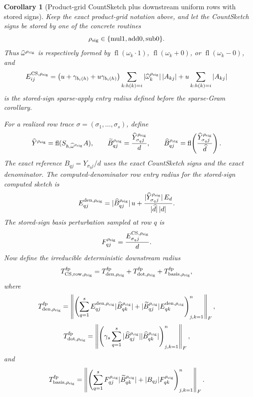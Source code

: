 \documentclass[11pt]{article}
\newcommand{\Frob}[1]{\left\lVert #1\right\rVert_F}
\newcommand{\fl}{\operatorname{fl}}
\newtheorem{corollary}[theorem]{Corollary}
\theoremstyle{remark}
\begin{document}
\begin{corollary}[Product-grid CountSketch plus downstream uniform rows with stored signs]
Keep the exact product-grid notation above, and let the CountSketch signs be
stored by one of the concrete routines
\[
  \rho_{\rm sig}\in\{\mathrm{mul1},\mathrm{add0},\mathrm{sub0}\}.
\]
Thus \(\widehat\omega^{\rho_{\rm sig}}\) is respectively formed by
\(\fl(\omega_k\cdot1)\), \(\fl(\omega_k+0)\), or \(\fl(\omega_k-0)\), and
\[
  E^{{\rm CS},\rho_{\rm sig}}_{ij}
  =
  \bigl(u+\gamma_{b_i(h)}+u\gamma_{b_i(h)}\bigr)
  \sum_{k:h(k)=i}|\widehat\omega_k^{\rho_{\rm sig}}|\,|A_{kj}|
  +
  u\sum_{k:h(k)=i}|A_{kj}|
\]
is the stored-sign sparse-apply entry radius defined before the sparse-Gram
corollary.

For a realized row trace \(\sigma=(\sigma_1,\ldots,\sigma_s)\), define
\[
  \widehat Y^{\rho_{\rm sig}}= \fl(S_{h,\widehat\omega^{\rho_{\rm sig}}}A),
  \qquad
  \widetilde B^{\rho_{\rm sig}}_{qj}
  =
  \frac{\widehat Y^{\rho_{\rm sig}}_{\sigma_qj}}{d},
  \qquad
  \widehat B^{\rho_{\rm sig}}_{qj}
  =
  \fl\!\left(
    \frac{\widehat Y^{\rho_{\rm sig}}_{\sigma_qj}}{\widehat d}
  \right).
\]
The exact reference \(B_{qj}=Y_{\sigma_qj}/d\) uses the exact CountSketch
signs and the exact denominator.  The computed-denominator row entry radius
for the stored-sign computed sketch is
\[
  E^{{\rm den},\rho_{\rm sig}}_{qj}
  =
  |\widehat B^{\rho_{\rm sig}}_{qj}|\,u
  +
  \frac{|\widehat Y^{\rho_{\rm sig}}_{\sigma_qj}|\,E_d}
       {|\widehat d|\,|d|}.
\]
The stored-sign basis perturbation sampled at row \(q\) is
\[
  F^{\rho_{\rm sig}}_{qj}
  =
  \frac{E^{{\rm CS},\rho_{\rm sig}}_{\sigma_qj}}{d}.
\]
Now define the irreducible deterministic downstream radius
\[
  T_{{\rm CS,row},\rho_{\rm sig}}^{\rm fp}
  =
  T_{{\rm den},\rho_{\rm sig}}^{\rm fp}
  +
  T_{{\rm dot},\rho_{\rm sig}}^{\rm fp}
  +
  T_{{\rm basis},\rho_{\rm sig}}^{\rm fp},
\]
where
\[
  T_{{\rm den},\rho_{\rm sig}}^{\rm fp}
  =
  \Frob{
    \left(
      \sum_{q=1}^{s}
      E^{{\rm den},\rho_{\rm sig}}_{qj}
        |\widehat B^{\rho_{\rm sig}}_{qk}|
      +
      |\widetilde B^{\rho_{\rm sig}}_{qj}|
        E^{{\rm den},\rho_{\rm sig}}_{qk}
    \right)_{j,k=1}^{n}
  },
\]
\[
  T_{{\rm dot},\rho_{\rm sig}}^{\rm fp}
  =
  \Frob{
    \left(
      \gamma_s\sum_{q=1}^{s}
      |\widehat B^{\rho_{\rm sig}}_{qj}|
      |\widehat B^{\rho_{\rm sig}}_{qk}|
    \right)_{j,k=1}^{n}
  },
\]
and
\[
  T_{{\rm basis},\rho_{\rm sig}}^{\rm fp}
  =
  \Frob{
    \left(
      \sum_{q=1}^{s}
      F^{\rho_{\rm sig}}_{qj}
        |\widetilde B^{\rho_{\rm sig}}_{qk}|
      +
      |B_{qj}|F^{\rho_{\rm sig}}_{qk}
    \right)_{j,k=1}^{n}
  }.
\]


\end{corollary}
\end{document}
